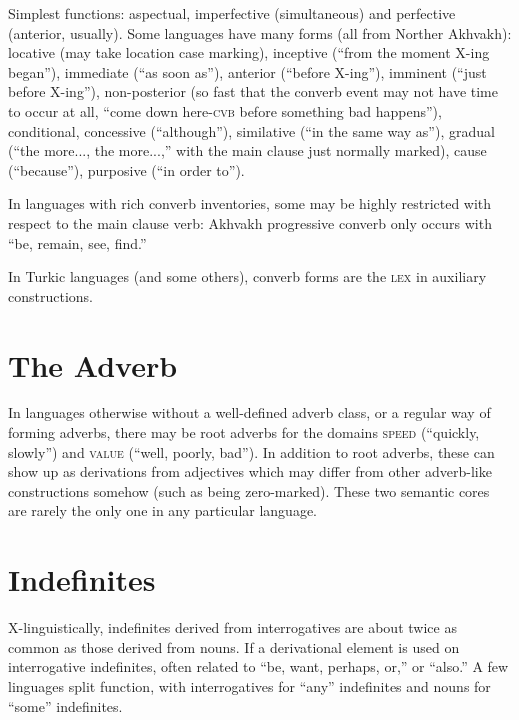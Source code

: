 \documentclass[11pt]{article}
\newcommand{\I}[1]{\textsc{#1}}   %
\begin{document}
Simplest functions: aspectual, imperfective (simultaneous) and
perfective (anterior, usually). Some languages have many forms (all
from Norther Akhvakh): locative (may take location case marking),
inceptive (``from the moment X-ing began''), immediate (``as soon
as''), anterior (``before X-ing''), imminent (``just before X-ing''),
non-posterior (so fast that the converb event may not have time to
occur at all, ``come down here-\I{cvb} before something bad
happens''), conditional, concessive (``although''), similative (``in
the same way as''), gradual (``the more..., the more...,'' with the
main clause just normally marked), cause (``because''), purposive
(``in order to'').

In languages with rich converb inventories, some may be highly
restricted with respect to the main clause verb: Akhvakh progressive
converb only occurs with ``be, remain, see, find.''

In Turkic languages (and some others), converb forms are the \I{lex}
in auxiliary constructions.


\section{The Adverb}
In languages otherwise without a well-defined adverb class, or a
regular way of forming adverbs, there may be root adverbs for the
domains \I{speed} (``quickly, slowly'') and \I{value} (``well,
poorly, bad''). In addition to root adverbs, these can show up as
derivations from adjectives which may differ from other adverb-like
constructions somehow (such as being zero-marked). These two semantic
cores are rarely the only one in any particular language.


\section{Indefinites}
X-linguistically, indefinites derived from interrogatives are about
twice as common as those derived from nouns. If a derivational element
is used on interrogative indefinites, often related to ``be, want,
perhaps, or,'' or ``also.'' A few linguages split function, with
interrogatives for ``any'' indefinites and nouns for ``some''
indefinites.
\end{document}
